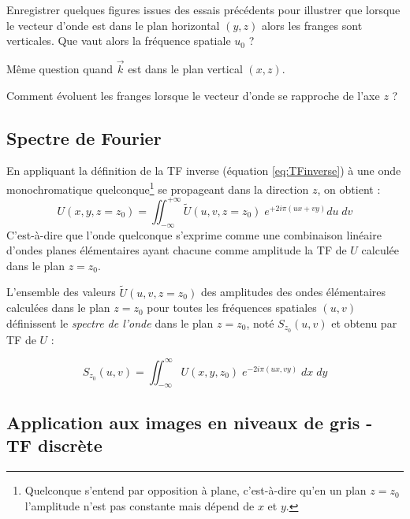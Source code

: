 \documentclass[a4paper,twoside,10pt]{book}
\newcommand{\TF}[1]{\tilde{#1}}
\renewcommand{\u}{u}
\renewcommand{\v}{v}
\begin{document}
\begin{question}
\item Enregistrer quelques figures issues des essais précédents pour illustrer que lorsque le vecteur d'onde est dans le plan horizontal $(y, z)$ alors les franges sont verticales. Que vaut alors la fréquence spatiale $\u_0$ ?
\item Même question quand $\vec{k}$ est dans le plan vertical $(x, z)$.
\item Comment évoluent les franges lorsque le vecteur d'onde se rapproche de l'axe $z$ ?
\end{question}

\subsection{Spectre de Fourier}

En appliquant la définition de la TF inverse (équation \ref{eq:TFinverse}) à une onde monochromatique quelconque\footnote{Quelconque s'entend par opposition à plane, c'est-à-dire qu'en un plan $z = z_0$ l'amplitude n'est pas constante mais dépend de $x$ et $y$.} se propageant dans la direction $z$, on obtient :
\begin{equation}\label{eq:TFinverseU}
U(x,y, z=z_0) = \iint_{-\infty}^{+\infty} \TF{U}(\u,\v, z = z_0) \; e^{+2i\pi(\u x + \v y)} d\u \; d\v
\end{equation}
C'est-à-dire que l'onde quelconque s'exprime comme une combinaison linéaire d'ondes planes élémentaires ayant chacune comme amplitude la TF de $U$ calculée dans le plan $z = z_0$.

L'ensemble des valeurs $\TF{U}(\u, \v, z = z_0)$ des amplitudes des ondes élémentaires calculées dans le plan $z = z_0$ pour toutes les fréquences spatiales $(\u, \v)$ définissent le \emph{spectre de l'onde} dans le plan $z = z_0$, noté $S_{z_0}(\u, \v)$ et obtenu par TF de $U$ :

\begin{equation}
S_{z_0}(\u, \v) = \iint_{-\infty}^{\infty} U(x, y, z_0) \; e^{-2i\pi (\u x, \v y)} \; dx \; dy
\end{equation}

\subsection{Application aux images en niveaux de gris - TF discrète}
\end{document}
